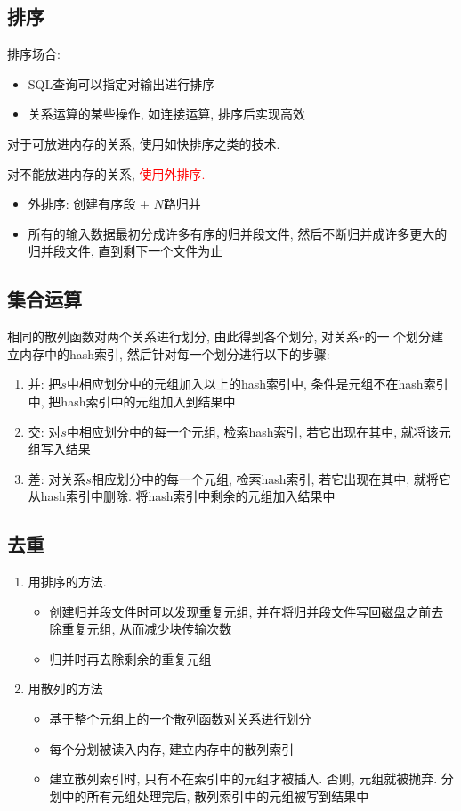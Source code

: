 \subsection{排序}

排序场合:
\begin{itemize}
    \item SQL查询可以指定对输出进行排序
    \item 关系运算的某些操作, 如连接运算, 排序后实现高效
\end{itemize}

对于可放进内存的关系, 使用如快排序之类的技术.

对不能放进内存的关系, \textcolor{red}{使用外排序.}
\begin{itemize}
    \item 外排序: 创建有序段 + $N$路归并
    \item 所有的输入数据最初分成许多有序的归并段文件, 然后不断归并成许多更大的归并段文件, 直到剩下一个文件为止
\end{itemize}

\subsection{集合运算}

相同的散列函数对两个关系进行划分, 由此得到各个划分, 对关系$r$的一
个划分建立内存中的hash索引, 然后针对每一个划分进行以下的步骤:
\begin{enumerate}
    \item 并: 把$s$中相应划分中的元组加入以上的hash索引中, 条件是元组不在hash索引中, 把hash索引中的元组加入到结果中
    \item 交: 对$s$中相应划分中的每一个元组, 检索hash索引, 若它出现在其中, 就将该元组写入结果
    \item 差: 对关系$s$相应划分中的每一个元组, 检索hash索引, 若它出现在其中, 就将它从hash索引中删除. 将hash索引中剩余的元组加入结果中
\end{enumerate}

\subsection{去重}

\begin{enumerate}
    \item 用排序的方法.
    \begin{itemize}
        \item 创建归并段文件时可以发现重复元组, 并在将归并段文件写回磁盘之前去除重复元组, 从而减少块传输次数
        \item 归并时再去除剩余的重复元组
    \end{itemize}
    \item 用散列的方法
    \begin{itemize}
        \item 基于整个元组上的一个散列函数对关系进行划分
        \item 每个分划被读入内存, 建立内存中的散列索引
        \item 建立散列索引时, 只有不在索引中的元组才被插入. 否则, 元组就被抛弃. 分划中的所有元组处理完后, 散列索引中的元组被写到结果中
    \end{itemize}
\end{enumerate}

